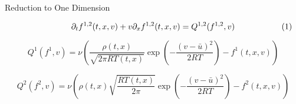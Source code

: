 \documentclass[unknownkeysallowed,final]{beamer}
\begin{document}
\begin{frame}{}
\begin{textblock}{19.5}
\begin{block}{\small{Reduction to One Dimension}}


\begin{equation*}
\label{bgk1d1}
\partial_{t} f^{1,2}(t,x,v) + v \partial_{x} f^{1,2}(t,x,v) = Q^{1,2}(f^{1,2},v)
\lefteqn{\hspace{20mm}(1)}
\end{equation*}


\begin{equation*}
\label{Q1}
Q^{1}(f^{1},v) = \nu \left( \frac{\rho(t, x)}{\sqrt{2 \pi RT(t, x)}} \exp \left( - \frac{(v - \bar{u})^{2}}{2RT} \right) - f^{1}(t, x, v) \right)
\end{equation*}

\begin{equation*}
\label{Q2}
Q^{2}(f^{2},v) = \nu \left( \rho(t, x) \sqrt{ \frac{RT(t, x)}{2 \pi}} \exp \left( - \frac{(v - \bar{u})^{2}}{2RT} \right) - f^{2}(t, x, v) \right)
\end{equation*}






\end{block}
\end{textblock}
\end{frame}
\end{document}
